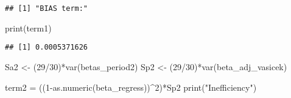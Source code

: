 \documentclass[
]{article}
\newenvironment{Shaded}{\begin{snugshade}}{\end{snugshade}}
\newcommand{\CommentTok}[1]{\textcolor[rgb]{0.56,0.35,0.01}{\textit{#1}}}
\newcommand{\DecValTok}[1]{\textcolor[rgb]{0.00,0.00,0.81}{#1}}
\newcommand{\FunctionTok}[1]{\textcolor[rgb]{0.00,0.00,0.00}{#1}}
\newcommand{\NormalTok}[1]{#1}
\newcommand{\OtherTok}[1]{\textcolor[rgb]{0.56,0.35,0.01}{#1}}
\newcommand{\SpecialCharTok}[1]{\textcolor[rgb]{0.00,0.00,0.00}{#1}}
\newcommand{\StringTok}[1]{\textcolor[rgb]{0.31,0.60,0.02}{#1}}
\begin{document}
\begin{Shaded}
\end{Shaded}

\begin{verbatim}
## [1] "BIAS term:"
\end{verbatim}

\begin{Shaded}
\begin{Highlighting}[]
\FunctionTok{print}\NormalTok{(term1)}
\end{Highlighting}
\end{Shaded}

\begin{verbatim}
## [1] 0.0005371626
\end{verbatim}

\begin{Shaded}
\begin{Highlighting}[]
\NormalTok{Sa2 }\OtherTok{\textless{}{-}}\NormalTok{ (}\DecValTok{29}\SpecialCharTok{/}\DecValTok{30}\NormalTok{)}\SpecialCharTok{*}\FunctionTok{var}\NormalTok{(betas\_period2)}
\NormalTok{Sp2 }\OtherTok{\textless{}{-}}\NormalTok{ (}\DecValTok{29}\SpecialCharTok{/}\DecValTok{30}\NormalTok{)}\SpecialCharTok{*}\FunctionTok{var}\NormalTok{(beta\_adj\_vasicek)}

\NormalTok{term2 }\OtherTok{=}\NormalTok{ ((}\DecValTok{1}\SpecialCharTok{{-}}\FunctionTok{as.numeric}\NormalTok{(beta\_regress))}\SpecialCharTok{\^{}}\DecValTok{2}\NormalTok{)}\SpecialCharTok{*}\NormalTok{Sp2}
\FunctionTok{print}\NormalTok{(}\StringTok{"Inefficiency"}\NormalTok{)}
\end{Highlighting}
\end{Shaded}
\end{document}
